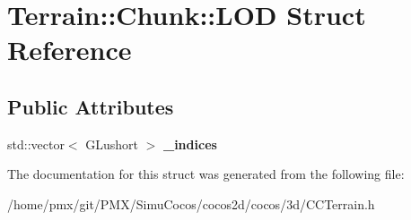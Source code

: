 \hypertarget{structTerrain_1_1Chunk_1_1LOD}{}\section{Terrain\+:\+:Chunk\+:\+:L\+OD Struct Reference}
\label{structTerrain_1_1Chunk_1_1LOD}
\subsection*{Public Attributes}
\begin{DoxyCompactItemize}
\item 
\mbox{\label{structTerrain_1_1Chunk_1_1LOD_a99c3dd7964fc55ea24f151ebd44d6417}} 
std\+::vector$<$ G\+Lushort $>$ {\bfseries \+\_\+indices}
\end{DoxyCompactItemize}


The documentation for this struct was generated from the following file\+:\begin{DoxyCompactItemize}
\item 
/home/pmx/git/\+P\+M\+X/\+Simu\+Cocos/cocos2d/cocos/3d/C\+C\+Terrain.\+h\end{DoxyCompactItemize}
